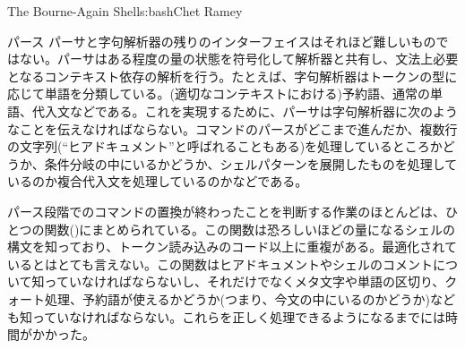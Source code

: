 \begin{aosachapter}{The Bourne-Again Shell}{s:bash}{Chet Ramey}
\begin{aosasect1}{パース}
パーサと字句解析器の残りのインターフェイスはそれほど難しいものではない。パーサはある程度の量の状態を符号化して解析器と共有し、文法上必要となるコンテキスト依存の解析を行う。たとえば、字句解析器はトークンの型に応じて単語を分類している。(適切なコンテキストにおける)予約語、通常の単語、代入文などである。これを実現するために、パーサは字句解析器に次のようなことを伝えなければならない。コマンドのパースがどこまで進んだか、複数行の文字列(``ヒアドキュメント''と呼ばれることもある)を処理しているところかどうか、条件分岐の中にいるかどうか、シェルパターンを展開したものを処理しているのか複合代入文を処理しているのかなどである。

パース段階でのコマンドの置換が終わったことを判断する作業のほとんどは、ひとつの関数()にまとめられている。この関数は恐ろしいほどの量になるシェルの構文を知っており、トークン読み込みのコード以上に重複がある。最適化されているとはとても言えない。この関数はヒアドキュメントやシェルのコメントについて知っていなければならないし、それだけでなくメタ文字や単語の区切り、クォート処理、予約語が使えるかどうか(つまり、今文の中にいるのかどうか)なども知っていなければならない。これらを正しく処理できるようになるまでには時間がかかった。


\end{aosasect1}
\end{aosachapter}
